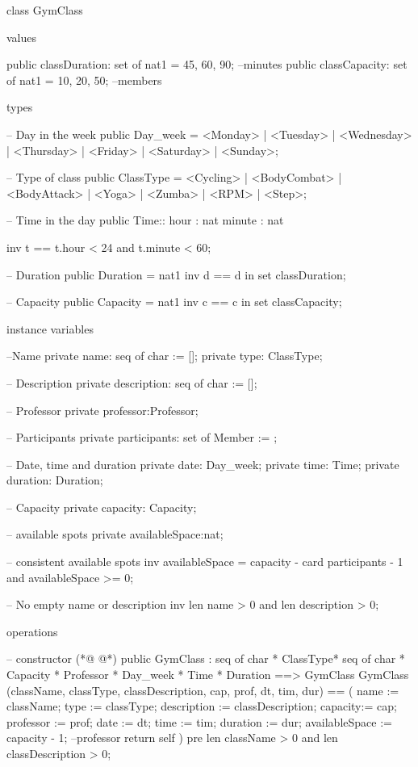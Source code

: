 \begin{vdmpp}[breaklines=true]
class GymClass

values
 
 public classDuration: set of nat1 = {45, 60, 90}; --minutes
 public classCapacity: set of nat1 = {10, 20, 50}; --members
 
types
 
 -- Day in the week  
 public Day_week = <Monday> | <Tuesday> | <Wednesday> | <Thursday> | <Friday> | <Saturday> | <Sunday>;
 
 -- Type of class
 public ClassType = <Cycling> | <BodyCombat> | <BodyAttack> | <Yoga> | <Zumba> | <RPM> | <Step>;  
 
 -- Time in the day
 public Time:: hour : nat
        minute : nat
        
 inv t == t.hour < 24 and t.minute < 60;
 
 -- Duration  
 public Duration = nat1
  inv d == d in set classDuration; 
 
 -- Capacity       
 public Capacity = nat1
  inv c == c in set classCapacity; 

instance variables
 
 --Name
 private name: seq of char := [];
 private type: ClassType;
 
 -- Description
 private description: seq of char := [];
 
 -- Professor
 private professor:Professor;
 
 -- Participants
 private participants: set of Member := {};
 
 -- Date, time and duration
 private date: Day_week;
 private time: Time;
 private duration: Duration;
 
  -- Capacity
 private capacity: Capacity; 
 
 -- available spots
 private availableSpace:nat;
 
 -- consistent available spots
 inv availableSpace = capacity - card participants - 1 and availableSpace >= 0;
 
  -- No empty name or description
  inv len name > 0 and len description > 0;
 
operations

  -- constructor 
(*@
\label{GymClass:65}
@*)
 public GymClass : seq of char * ClassType* seq of char * Capacity * Professor * Day_week * Time * Duration ==> GymClass
 GymClass (className, classType, classDescription, cap, prof, dt, tim, dur) == (
  name := className;
  type := classType;
  description := classDescription;
  capacity:= cap;
  professor := prof;
  date := dt;
  time := tim;
  duration := dur;
  availableSpace := capacity - 1; --professor
  return self
 )
 pre len className > 0 and len classDescription > 0;
 

\end{vdmpp}
